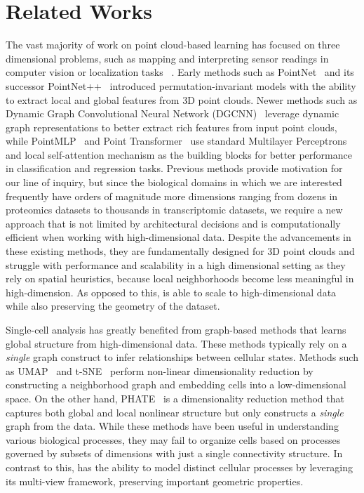 \section{Related Works}
\label{sec:related}
The vast majority of work on point cloud-based learning has focused on three dimensional problems, such as mapping and interpreting sensor readings in computer vision or localization tasks ~\cite{pointnet, pointnet++, pointtransformer, pointmlp, dgcnn}. Early methods such as PointNet~\cite{pointnet} and its successor PointNet++~\cite{pointnet++} introduced permutation-invariant models with the ability to extract local and global features from 3D point clouds. Newer methods such as Dynamic Graph Convolutional Neural Network (DGCNN)~\cite{dgcnn} leverage dynamic graph representations to better extract rich features from input point clouds, while PointMLP~\cite{pointmlp} and Point Transformer~\cite{pointtransformer} use standard Multilayer Perceptrons and local self-attention mechanism as the building blocks for better performance in classification and regression tasks. Previous methods provide motivation for our line of inquiry, but since the biological domains in which we are interested frequently have orders of magnitude more dimensions ranging from dozens in proteomics datasets to thousands in transcriptomic datasets, we require a new approach that is not limited by architectural decisions and is computationally efficient when working with high-dimensional data. Despite the advancements in these existing methods, they are fundamentally designed for 3D point clouds and struggle with performance and scalability in a high dimensional setting as they rely on spatial heuristics, because local neighborhoods become less meaningful in high-dimension. As opposed to this, {\modelname} is able to scale to high-dimensional data while also preserving the geometry of the dataset.

Single-cell analysis has greatly benefited from graph-based methods that learns global structure from high-dimensional data. These methods typically rely on a \emph{single} graph construct to infer relationships between cellular states. Methods such as UMAP~\cite{mcinnes2020umapuniformmanifoldapproximation} and t-SNE~\cite{JMLR:v9:vandermaaten08a} perform non-linear dimensionality reduction by constructing a neighborhood graph and embedding cells into a low-dimensional space. On the other hand, PHATE~\cite{moon2019visualizing} is a dimensionality reduction method that captures both global and local nonlinear structure but only constructs a \emph{single} graph from the data. While these methods have been useful in understanding various biological processes, they may fail to organize cells based on processes governed by subsets of dimensions with just a single connectivity structure. In contrast to this, {\modelname} has the ability to model distinct cellular processes by leveraging its multi-view framework, preserving important geometric properties.